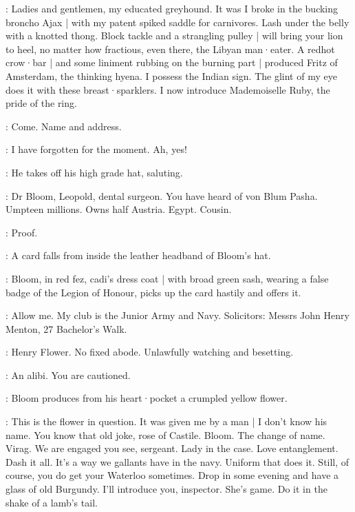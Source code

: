 \Maffei:
Ladies and gentlemen,
my educated greyhound.
It was I broke in the bucking broncho Ajax |
with my patent spiked saddle for carnivores.
Lash under the belly with a knotted thong.
Block tackle and a strangling pulley |
will bring your lion to heel,
no matter how fractious,
even  there,
the Libyan man·eater.
A redhot crow·bar |
and some liniment rubbing on the burning part |
produced Fritz of Amsterdam,
the thinking hyena.
I possess the Indian sign.
The glint of my eye does it with these breast·sparklers.
I now introduce Mademoiselle Ruby,
the pride of the ring.

\FirstWatch[1]:
Come.
Name and address.

\Bloom:
I have forgotten for the moment.
Ah,
yes!

:
He takes off his high grade hat,
saluting.

\Bloom:
Dr Bloom,
Leopold,
dental surgeon.
You have heard of von Blum Pasha.
Umpteen millions.
Owns half Austria.
Egypt.
Cousin.

\FirstWatch:
Proof.

:
A card falls from inside the leather headband of Bloom's hat.

:
Bloom,
in red fez,
cadi's dress coat |
with broad green sash,
wearing a false badge of the Legion of Honour,
picks up the card hastily and offers it.

\Bloom:
Allow me.
My club is the Junior Army and Navy.
Solicitors:
Messrs John Henry Menton,
27 Bachelor's Walk.

\FirstWatch:
Henry Flower.
No fixed abode.
Unlawfully watching and besetting.

\SecondWatch[2]:
An alibi.
You are cautioned.

:
Bloom produces from his heart·pocket a crumpled yellow flower.

\Bloom:
This is the flower in question.
It was given me by a man |
I don't know his name.
You know that old joke,
rose of Castile.
Bloom.
The change of name.
Virag.
We are engaged you see,
sergeant.
Lady in the case.
Love entanglement.
Dash it all.
It's a way we gallants have in the navy.
Uniform that does it.
Still,
of course,
you do get your Waterloo sometimes.
Drop in some evening and have a glass of old Burgundy.
I'll introduce you,
inspector.
She's game.
Do it in the shake of a lamb's tail.

